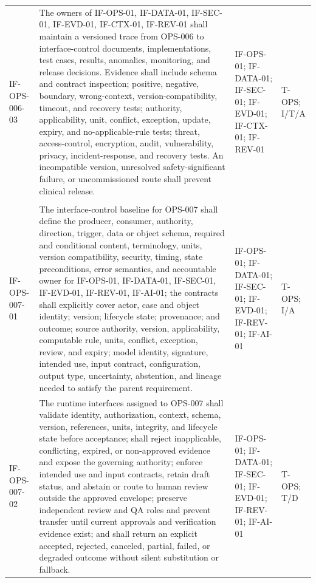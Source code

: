 \documentclass[11pt,letterpaper]{article}
\begin{document}
\begin{scriptsize}
\begin{longtable}{@{}L{0.14\textwidth}L{0.49\textwidth}L{0.19\textwidth}L{0.10\textwidth}@{}}
\addlinespace[2pt]
\mbox{IF-OPS-006-03} & The owners of IF-OPS-01, IF-DATA-01, IF-SEC-01, IF-EVD-01, IF-CTX-01, IF-REV-01 shall maintain a versioned trace from OPS-006 to interface-control documents, implementations, test cases, results, anomalies, monitoring, and release decisions. Evidence shall include schema and contract inspection; positive, negative, boundary, wrong-context, version-compatibility, timeout, and recovery tests; authority, applicability, unit, conflict, exception, update, expiry, and no-applicable-rule tests; threat, access-control, encryption, audit, vulnerability, privacy, incident-response, and recovery tests. An incompatible version, unresolved safety-significant failure, or uncommissioned route shall prevent clinical release. & IF-OPS-01; IF-DATA-01; IF-SEC-01; IF-EVD-01; IF-CTX-01; IF-REV-01 & T-OPS; I\slash\allowbreak{}T\slash\allowbreak{}A \\
\addlinespace[2pt]
 \\
\addlinespace[2pt]
\mbox{IF-OPS-007-01} & The interface-control baseline for OPS-007 shall define the producer, consumer, authority, direction, trigger, data or object schema, required and conditional content, terminology, units, version compatibility, security, timing, state preconditions, error semantics, and accountable owner for IF-OPS-01, IF-DATA-01, IF-SEC-01, IF-EVD-01, IF-REV-01, IF-AI-01; the contracts shall explicitly cover actor, case and object identity; version; lifecycle state; provenance; and outcome; source authority, version, applicability, computable rule, units, conflict, exception, review, and expiry; model identity, signature, intended use, input contract, configuration, output type, uncertainty, abstention, and lineage needed to satisfy the parent requirement. & IF-OPS-01; IF-DATA-01; IF-SEC-01; IF-EVD-01; IF-REV-01; IF-AI-01 & T-OPS; I\slash\allowbreak{}A \\
\addlinespace[2pt]
\mbox{IF-OPS-007-02} & The runtime interfaces assigned to OPS-007 shall validate identity, authorization, context, schema, version, references, units, integrity, and lifecycle state before acceptance; shall reject inapplicable, conflicting, expired, or non-approved evidence and expose the governing authority; enforce intended use and input contracts, retain draft status, and abstain or route to human review outside the approved envelope; preserve independent review and QA roles and prevent transfer until current approvals and verification evidence exist; and shall return an explicit accepted, rejected, canceled, partial, failed, or degraded outcome without silent substitution or fallback. & IF-OPS-01; IF-DATA-01; IF-SEC-01; IF-EVD-01; IF-REV-01; IF-AI-01 & T-OPS; T\slash\allowbreak{}D \\

\end{longtable}
\end{scriptsize}
\end{document}
